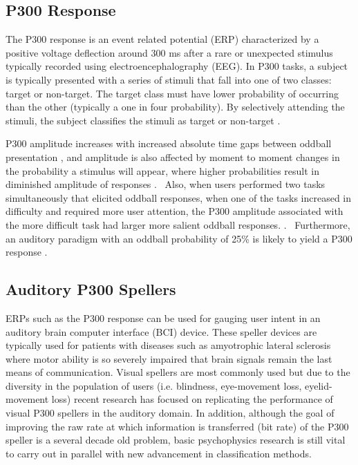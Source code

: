 \documentclass[10pt]{article}
\begin{document}
\subsection{P300 Response} 
The P300 response is an event related
potential (ERP) characterized by a positive voltage deflection
around 300 ms after a rare or unexpected stimulus typically recorded
using electroencephalography (EEG). In P300 tasks, a subject is
typically presented with a series of stimuli that fall into one of
two classes: target or non-target.  The target class must have lower
probability of occurring than the other (typically a one in four
probability).  By selectively attending the stimuli, the subject
classifies the stimuli as target or non-target \cite{Wolpaw2012}.

P300 amplitude increases with increased absolute
time gaps between oddball presentation \cite{GONSALVEZ2002}, and
amplitude is also affected by moment to moment changes in the
probability a stimulus will appear, where higher probabilities
result in diminished amplitude of responses \cite{Donchin1981}.
 Also, when users performed two tasks simultaneously that elicited
oddball responses, when one of the tasks increased in difficulty and
required more user attention, the P300 amplitude associated with the
more difficult task had larger more salient oddball responses.
\cite{Sirevaag1989}.  Furthermore, an auditory paradigm with an
oddball probability of 25\% is likely to yield a P300 response
\cite{Nijboer2008}. 

\subsection{Auditory P300 Spellers} 
ERPs such as the P300 response can be used for gauging user intent
in an auditory brain computer interface (BCI) device.
These speller
devices are typically used for patients with diseases such as
amyotrophic lateral sclerosis where motor ability is so severely
impaired that brain signals remain the last means of
communication\cite{Nijboer2008}.  Visual spellers are most commonly
used but due to the diversity in the population of users (i.e.
blindness, eye-movement loss, eyelid-movement loss) recent research
has focused on replicating the performance of visual P300 spellers
in the auditory domain.  In addition, although the goal of improving
the raw rate at which information is transferred (bit rate) of
the P300 speller is a several decade old problem, basic
psychophysics research is still vital to carry out in parallel with
new advancement in classification methods.
\end{document}
